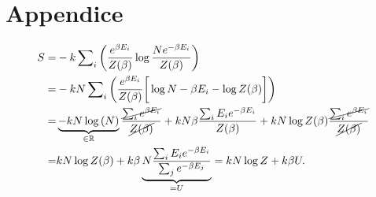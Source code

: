 \documentclass{article}
\theoremstyle{remark}
\begin{document}
\section{Appendice}
\label{cap:appendice}
\begin{equation}
    \begin{split}
    S=&-k\sum\nolimits_i\bigg(\frac{e^{\beta E_i}}{Z(\beta)}\log{\frac{Ne^{-\beta E_i}}{Z(\beta)}}\bigg) \\
    =&-kN\sum\nolimits_i\bigg(\frac{e^{\beta E_i}}{Z(\beta)}\bigg[\log{N}-\beta E_i-\log{Z(\beta)}\bigg]\bigg) \\
    =&\underbrace{-kN\log{(N)}}_{\in\mathbb{R}}\frac{\cancel{\sum\nolimits_ie^{\beta E_i}}}{\cancel{Z(\beta)}}+kN\beta\frac{\sum\nolimits_iE_ie^{-\beta E_i}}{Z(\beta)}+kN\log{Z(\beta)}\frac{\cancel{\sum\nolimits_ie^{\beta E_i}}}{\cancel{Z(\beta)}} \\
    =&kN\log{Z(\beta)}+k\beta\underbrace{N\frac{\sum\nolimits_iE_ie^{-\beta E_i}}{\sum\nolimits_je^{-\beta E_j}}}_{=U}=kN\log{Z}+k\beta U.
\end{split}
\end{equation}
\end{document}
